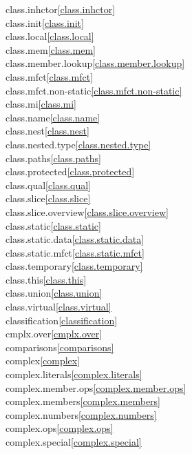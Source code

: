 \begin{multicols}{2}
class.inhctor\quad\ref{class.inhctor}\\
class.init\quad\ref{class.init}\\
class.local\quad\ref{class.local}\\
class.mem\quad\ref{class.mem}\\
class.member.lookup\quad\ref{class.member.lookup}\\
class.mfct\quad\ref{class.mfct}\\
class.mfct.non-static\quad\ref{class.mfct.non-static}\\
class.mi\quad\ref{class.mi}\\
class.name\quad\ref{class.name}\\
class.nest\quad\ref{class.nest}\\
class.nested.type\quad\ref{class.nested.type}\\
class.paths\quad\ref{class.paths}\\
class.protected\quad\ref{class.protected}\\
class.qual\quad\ref{class.qual}\\
class.slice\quad\ref{class.slice}\\
class.slice.overview\quad\ref{class.slice.overview}\\
class.static\quad\ref{class.static}\\
class.static.data\quad\ref{class.static.data}\\
class.static.mfct\quad\ref{class.static.mfct}\\
class.temporary\quad\ref{class.temporary}\\
class.this\quad\ref{class.this}\\
class.union\quad\ref{class.union}\\
class.virtual\quad\ref{class.virtual}\\
classification\quad\ref{classification}\\
cmplx.over\quad\ref{cmplx.over}\\
comparisons\quad\ref{comparisons}\\
complex\quad\ref{complex}\\
complex.literals\quad\ref{complex.literals}\\
complex.member.ops\quad\ref{complex.member.ops}\\
complex.members\quad\ref{complex.members}\\
complex.numbers\quad\ref{complex.numbers}\\
complex.ops\quad\ref{complex.ops}\\
complex.special\quad\ref{complex.special}\\

\end{multicols}
